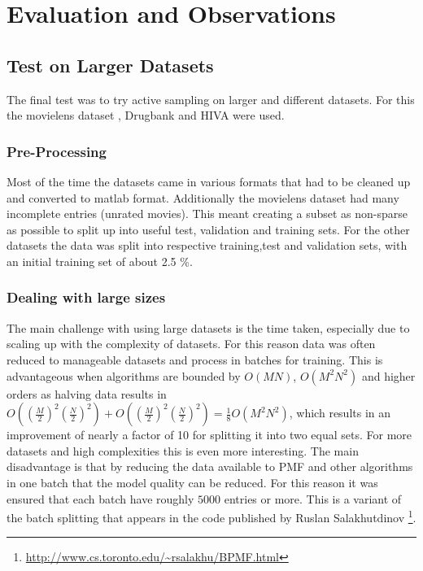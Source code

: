 \chapter{Evaluation and Observations}
\ifpdf
    \graphicspath{{Chapter4/Chapter4Figs/PNG/}{Chapter4/Chapter4Figs/PDF/}{Chapter4/Chapter4Figs/}}
\else
    \graphicspath{{Chapter4/Chapter4Figs/EPS/}{Chapter4/Chapter4Figs/}}
\fi

\section{Test on Larger Datasets}
The final test was to try active sampling on larger and different datasets. For this the movielens dataset \cite{movielensdata}, Drugbank \cite{law2014drugbank} and HIVA \cite{hivadata} were used.
\subsection{Pre-Processing}
Most of the time the datasets came in various formats that had to be cleaned up and converted to matlab format. Additionally the movielens dataset had many incomplete entries (unrated movies). This meant creating a subset as non-sparse as possible to split up into useful test, validation and training sets. For the other datasets the data was split into respective training,test and validation sets, with an initial training set of about 2.5 \%.


\subsection{Dealing with large sizes}

The main challenge with using large datasets is the time taken, especially due to scaling up with the complexity of datasets. For this reason data was often reduced to manageable datasets and process in batches for training. This is advantageous when algorithms are bounded by $O(MN)$, $O(M^2N^2)$ and higher orders as halving data results in $O(\left(\frac{M}{2}\right)^2 \left(\frac{N}{2}\right)^2)+ O(\left(\frac{M}{2}\right)^2 \left(\frac{N}{2}\right)^2) = \frac{1}{8}O(M^2 N^2)$, which results in an improvement of nearly a factor of 10 for splitting it into two equal sets. For more datasets and high complexities this is even more interesting. The main disadvantage is that by reducing the data available to PMF and other algorithms in one batch that the model quality can be reduced. For this reason it was ensured that each batch have roughly $5000$ entries or more. This is a variant of the batch splitting that appears in the code published by Ruslan Salakhutdinov\cite{SalMnih2008} \footnote{\url{http://www.cs.toronto.edu/~rsalakhu/BPMF.html}}.
